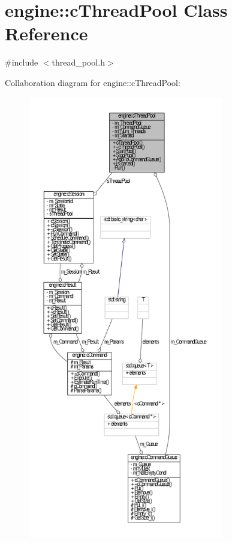 \hypertarget{classengine_1_1cThreadPool}{\section{engine\-:\-:c\-Thread\-Pool \-Class \-Reference}
\label{classengine_1_1cThreadPool}
}


{\ttfamily \#include $<$thread\-\_\-pool.\-h$>$}



\-Collaboration diagram for engine\-:\-:c\-Thread\-Pool\-:\nopagebreak
\begin{figure}[H]
\begin{center}
\leavevmode
\includegraphics[height=550pt]{classengine_1_1cThreadPool__coll__graph}
\end{center}
\end{figure}
